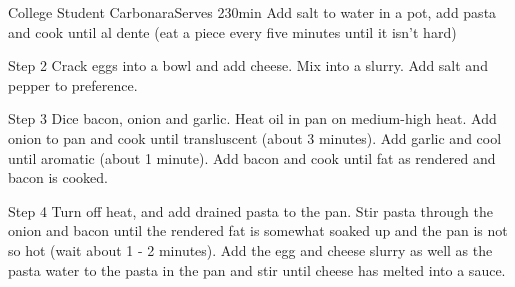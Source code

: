 \begin{recipe}{College Student Carbonara}{Serves 2}{30min}
Add salt to water in a pot, add pasta and cook until al dente (eat a piece every five minutes until it isn't hard)

Step 2
Crack eggs into a bowl and add cheese. Mix into a slurry. Add salt and pepper to preference.

Step 3
Dice bacon, onion and garlic. Heat oil in pan on medium-high heat. Add onion to pan and cook until transluscent (about 3 minutes). Add garlic and cool until aromatic (about 1 minute). Add bacon and cook until fat as rendered and bacon is cooked.

Step 4
Turn off heat, and add drained pasta to the pan. Stir pasta through the onion and bacon until the rendered fat is somewhat soaked up and the pan is not so hot (wait about 1 - 2 minutes). Add the egg and cheese slurry as well as the pasta water to the pasta in the pan and stir until cheese has melted into a sauce.

\end{recipe}
